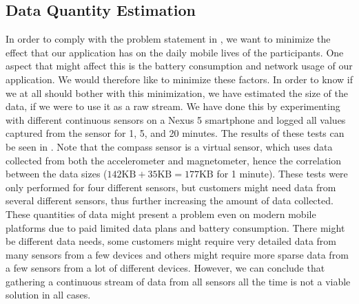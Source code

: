 
\subsection{Data Quantity Estimation}
\label{sec:data_quantity_estimation}


In order to comply with the problem statement in , we want to minimize the effect that our application has on the daily mobile lives of the participants. One aspect that might affect this is the battery consumption and network usage of our application. We would therefore like to minimize these factors. In order to know if we at all should bother with this minimization, we have estimated the size of the data, if we were to use it as a raw stream. We have done this by experimenting with different continuous sensors on a Nexus 5 smartphone and logged all values captured from the sensor for 1, 5, and 20 minutes. The results of these tests can be seen in . Note that the compass sensor is a virtual sensor, which uses data collected from both the accelerometer and magnetometer, hence the correlation between the data sizes ($142 \text{KB} + 35 \text{KB} = 177 \text{KB}$ for 1 minute). These tests were only performed for four different sensors, but customers might need data from several different sensors, thus further increasing the amount of data collected. These quantities of data might present a problem even on modern mobile platforms due to paid limited data plans and battery consumption. There might be different data needs, some customers might require very detailed data from many sensors from a few devices and others might require more sparse data from a few sensors from a lot of different devices. However, we can conclude that gathering a continuous stream of data from all sensors all the time is not a viable solution in all cases.

